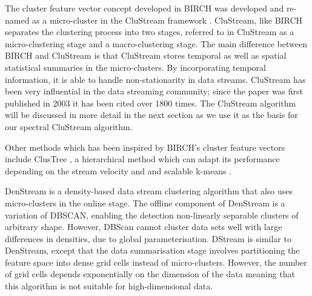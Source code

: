 The cluster feature vector concept developed in BIRCH was developed and re-named as a micro-cluster in the CluStream framework \citep{Aggarwal2003}. CluStream, like BIRCH separates the clustering process into two stages, referred to in CluStream as a micro-clustering stage and a macro-clustering stage. The main difference between BIRCH and CluStream is that CluStream stores temporal as well as spatial statistical summaries in the micro-clusters. By incorporating temporal information, it is able to handle non-stationarity in data streams. CluStream has been very influential in the data streaming community; since the paper was first published in 2003 it has been cited over 1800 times. The CluStream algorithm will be discussed in more detail in the next section as we use it as the basis for our spectral CluStream algorithm. 

Other methods which has been inspired by BIRCH's cluster feature vectors include ClusTree \citep{kranen2011clustree}, a hierarchical method which can adapt its performance depending on the stream velocity and and scalable k-means \citep{bradley1998refining}.

DenStream \citep{cao2006density} is a density-based data stream clustering algorithm that also uses micro-clusters in the online stage. The offline component of DenStream is a variation of DBSCAN, enabling the detection non-linearly separable clusters of arbitrary shape. However, DBScan cannot cluster data sets well with large differences in densities, due to global parameterisation. DStream \citep{chen2007density} is similar to DenStream, except that the data summarisation stage involves partitioning the feature space into dense grid cells instead of micro-clusters. However, the number of grid cells depends exponentially on the dimension of the data meaning that this algorithm is not suitable for high-dimensional data. 


